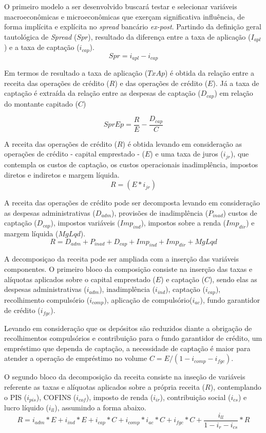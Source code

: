 \documentclass[12pt,12pt,openright,oneside,a4paper,chapter=TITLE,section=TITLE,subsection=TITLE,subsubsection=TITLE english,french,spanish,portugues,sumario=tradicional]{abntex2}
\begin{document}
O primeiro modelo a ser desenvolvido buscará testar e selecionar variáveis macroeconômicas e microeconômicas que exerçam significativa influência, de forma implícita e explícita no \emph{spread} bancário \emph{ex-post}. Partindo da definição geral tautológica de \emph{Spread} (\(Spr\)), resultado da diferença entre a taxa de aplicação (\(I_{apl}\)) e a taxa de captação (\(i_{cap}\)).
\[
Spr = i_{apl} - i_{cap} 
\]

Em termos de resultado a taxa de aplicação (\(TxAp\)) é obtida da relação entre a receita das operações de crédito (\(R\)) e das operações de crédito (\(E\)). Já a taxa de captação é extraída da relação entre as despesas de captação (\(D_{cap}\)) em relação do montante capitado (\(C\))

\[
SprEp = \frac{R}{E} - \frac{D_{cap}}{C}
\]

A receita das operações de crédito (\(R\)) é obtida levando em consideração as operações de crédito - capital emprestado - (\(E\)) e uma taxa de juros (\(i_{jr}\)), que contempla os custos de captação, os custos operacionais inadimplência, impostos diretos e indiretos e margem líquida.
\[
R= (E * i_{jr}) 
\]

A receita das operações de crédito pode ser decomposta levando em consideração as despesas administrativas (\(D_{adm}\)), provisões de inadimplência (\(P_{inad}\)) custos de captação (\(D_{cap}\)), impostos variáveis (\(Imp_{ind}\)), impostos sobre a renda (\(Imp_{dir}\)) e margem líquida (\(MgLqd\)).
\[
R = D_{adm} + P_{inad} + D_{cap} + Imp_{ind} + Imp_{dir} + MgLqd
\]

A decomposiçao da receita pode ser ampliada com a inserção das variáveis componentes. O primeiro bloco da composição consiste na inserção das taxas e alíquotas aplicados sobre o capital emprestado (\(E\)) e captação (\(C\)), sendo elas as despesas administrativas (\(i_{adm}\)), inadimplência (\(i_{ind}\)), captação (\(i_{cap}\)), recolhimento compulsório (\(i_{comp}\)), aplicação de compulsório(\(i_{ac}\)), fundo garantidor de crédito (\(i_{fgc}\)).

Levando em consideração que os depósitos são reduzidos diante a obrigação de recolhimentos compulsórios e contribuição para o fundo garantidor de crédito, um empréstimo que dependa de captação, a necessidade de captação é maior para atender a operação de empréstimo no volume \(C = E / (1 - i_{comp} - i_{fgc})\).

O segundo bloco da decomposição da receita consiste na inseção de variáveis referente as taxas e alíquotas aplicados sobre a própria receita (\(R\)), contemplando o PIS (\(i_{pis}\)), COFINS (\(i_{cof}\)), imposto de renda (\(i_{ir}\)), contribuição social (\(i_{cs}\)) e lucro líquido (\(i_{ll}\)), assumindo a forma abaixo.
\[
R = i_{adm}*E + i_{ind}*E + i_{cap}*C + i_{comp}*i_{ac}*C + i_{fgc}*C + \frac{i_{ll}}{1 - i_{r} - i_{cs}}*R 
\]
\end{document}
